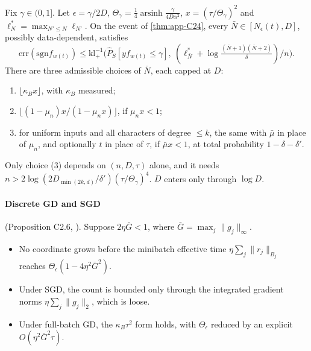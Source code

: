 \begin{corollary}\label{cor:app-C25}
\quad Fix $\gamma\in(0,1]$. Let $\epsilon=\gamma/2D$, $\Theta_\gamma=\frac14\operatorname{arsinh}\frac{\gamma}{4D\alpha^2}$, $x=(\tau/\Theta_\gamma)^2$ and $\ell^*_N=\max_{N'\le N}\ell_{N'}$. On the event of \cref{thm:app-C24}, every $\bar N\in[N_\epsilon(t),D]$, possibly data-dependent, satisfies
\[\mathrm{err}(\mathrm{sgn}f_{w(t)})\le\mathrm{kl}^{-1}_+\big(\widehat P_S[yf_{w(t)}\le\gamma],\ (\ell^*_{\bar N}+\log\tfrac{(\bar N+1)(\bar N+2)}\delta)/n\big).\]
There are three admissible choices of $\bar N$, each capped at $D$:
\begin{enumerate}[label=(\arabic*),nosep]
\item $\lfloor\kappa_Bx\rfloor$, with $\kappa_B$ measured;
\item $\lfloor(1-\mu_n)x/(1-\mu_nx)\rfloor$, if $\mu_nx<1$;
\item for uniform inputs and all characters of degree $\le k$, the same with $\bar\mu$ in place of $\mu_n$, and optionally $t$ in place of $\tau$, if $\bar\mu x<1$, at total probability $1-\delta-\delta'$.
\end{enumerate}
\end{corollary}
Only choice (3) depends on $(n,D,\tau)$ alone, and it needs $n>2\log(2D_{\min(2k,d)}/\delta')(\tau/\Theta_\gamma)^4$. $D$ enters only through $\log D$.

\paragraph{Discrete GD and SGD} (Proposition C2.6, ). Suppose $2\eta\bar G<1$, where $\bar G=\max_j\|g_j\|_\infty$.
\begin{itemize}[nosep]
\item No coordinate grows before the minibatch effective time $\eta\sum_j\|r_j\|_{B_j}$ reaches $\Theta_\epsilon(1-4\eta^2\bar G^2)$.
\item Under SGD, the count is bounded only through the integrated gradient norms $\eta\sum_j\|g_j\|_2$, which is loose.
\item Under full-batch GD, the $\kappa_B\tau^2$ form holds, with $\Theta_\epsilon$ reduced by an explicit $O(\eta^2\bar G^2\tau)$.
\end{itemize}

